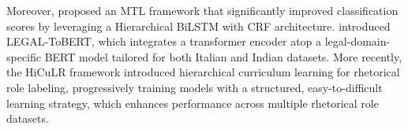 Moreover, \citet{malik-etal-2022-semantic} proposed an MTL framework that significantly improved classification scores by leveraging a Hierarchical BiLSTM with CRF architecture. \citet{marino2023automatic} introduced LEGAL-ToBERT, which integrates a transformer encoder atop a legal-domain-specific BERT model tailored for both Italian and Indian datasets. More recently, the HiCuLR framework \citet{santosh2024hiculr} introduced hierarchical curriculum learning for rhetorical role labeling, progressively training models with a structured, easy-to-difficult learning strategy, which enhances performance across multiple rhetorical role datasets.